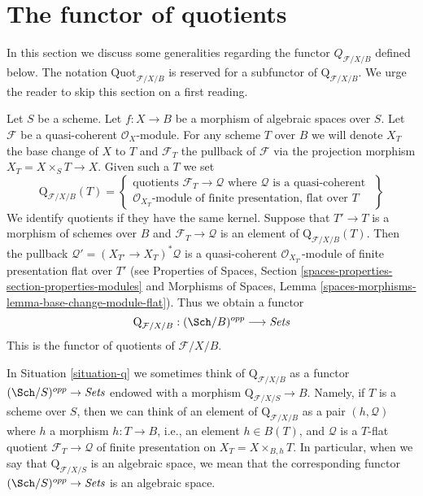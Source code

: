 \section{The functor of quotients}
\label{section-functor-quotients}

\noindent
In this section we discuss some generalities regarding the functor
$Q_{\mathcal{F}/X/B}$ defined below.
The notation $\text{Quot}_{\mathcal{F}/X/B}$ is reserved for a
subfunctor of $\text{Q}_{\mathcal{F}/X/B}$.
We urge the reader to skip this section on a first reading.

\begin{situation}
\label{situation-q}
Let $S$ be a scheme. Let $f : X \to B$ be a morphism of algebraic spaces
over $S$. Let $\mathcal{F}$ be a quasi-coherent $\mathcal{O}_X$-module.
For any scheme $T$ over $B$ we will denote $X_T$ the base change of
$X$ to $T$ and $\mathcal{F}_T$ the pullback
of $\mathcal{F}$ via the projection morphism $X_T = X \times_S T \to X$.
Given such a $T$ we set
$$
\text{Q}_{\mathcal{F}/X/B}(T) =
\left\{
\begin{matrix}
\text{quotients }\mathcal{F}_T \to \mathcal{Q}\text{ where }
\mathcal{Q}\text{ is a quasi-coherent }\\
\mathcal{O}_{X_T}\text{-module of finite presentation, flat over }T
\end{matrix}
\right\}
$$
We identify quotients if they have the same kernel. Suppose
that $T' \to T$ is a morphism of schemes over $B$ and
$\mathcal{F}_T \to \mathcal{Q}$ is an element of
$\text{Q}_{\mathcal{F}/X/B}(T)$. Then the pullback
$\mathcal{Q}' = (X_{T'} \to X_T)^*\mathcal{Q}$ is a quasi-coherent
$\mathcal{O}_{X_{T'}}$-module of finite presentation flat over $T'$
(see Properties of Spaces, Section
\ref{spaces-properties-section-properties-modules}
and
Morphisms of Spaces, Lemma
\ref{spaces-morphisms-lemma-base-change-module-flat}).
Thus we obtain a functor
\begin{equation}
\label{equation-q}
\text{Q}_{\mathcal{F}/X/B} : (\Sch/B)^{opp} \longrightarrow \textit{Sets}
\end{equation}
This is the functor of quotients of $\mathcal{F}/X/B$.
\end{situation}

\noindent
In Situation \ref{situation-q} we sometimes think of
$\text{Q}_{\mathcal{F}/X/B}$ as a functor
$(\Sch/S)^{opp} \to \textit{Sets}$ endowed
with a morphism $\text{Q}_{\mathcal{F}/X/S} \to B$.
Namely, if $T$ is a scheme over $S$, then we can think of an element
of $\text{Q}_{\mathcal{F}/X/B}$ as a pair $(h, \mathcal{Q})$
where $h$ a morphism $h : T \to B$, i.e., an element $h \in B(T)$,
and $\mathcal{Q}$ is a $T$-flat quotient $\mathcal{F}_T \to \mathcal{Q}$
of finite presentation on $X_T = X \times_{B, h} T$. In particular, when we say
that $\text{Q}_{\mathcal{F}/X/S}$ is an algebraic space, we mean that the
corresponding functor $(\Sch/S)^{opp} \to \textit{Sets}$ is an algebraic space.

